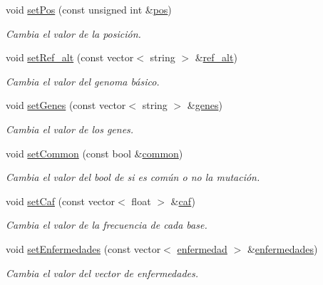 \begin{DoxyCompactItemize}
void \hyperlink{classmutacion_a2667189a28d3ac983a8f63ca92e81fba}{set\+Pos} (const unsigned int \&\hyperlink{classmutacion_ae1487b8648d0eaad68de5e4e5a87f3ff}{pos})
\begin{DoxyCompactList}\small\item\em Cambia el valor de la posición. \end{DoxyCompactList}\item 
void \hyperlink{classmutacion_a66b8d594a0bddbe4262f7a13ef551d07}{set\+Ref\+\_\+alt} (const vector$<$ string $>$ \&\hyperlink{classmutacion_abeb13e023fc9a34120106bccf58d5086}{ref\+\_\+alt})
\begin{DoxyCompactList}\small\item\em Cambia el valor del genoma básico. \end{DoxyCompactList}\item 
void \hyperlink{classmutacion_a91fd0ad088ac82897ccad36598b43830}{set\+Genes} (const vector$<$ string $>$ \&\hyperlink{classmutacion_a65fb9e2186d1c54d490289661b141aa1}{genes})
\begin{DoxyCompactList}\small\item\em Cambia el valor de los genes. \end{DoxyCompactList}\item 
void \hyperlink{classmutacion_ab62d36e9bad78d43ace74fdaec909ca6}{set\+Common} (const bool \&\hyperlink{classmutacion_a6dabfef6167d64030f095887b15f65dd}{common})
\begin{DoxyCompactList}\small\item\em Cambia el valor del bool de si es común o no la mutación. \end{DoxyCompactList}\item 
void \hyperlink{classmutacion_a52b79ec257cc96ad5c38a34ac4f2e827}{set\+Caf} (const vector$<$ float $>$ \&\hyperlink{classmutacion_aeb2ac56009900d9319873d00ee80e090}{caf})
\begin{DoxyCompactList}\small\item\em Cambia el valor de la frecuencia de cada base. \end{DoxyCompactList}\item 
void \hyperlink{classmutacion_acaad50a2aab9f6df3994a491eab44a86}{set\+Enfermedades} (const vector$<$ \hyperlink{classenfermedad}{enfermedad} $>$ \&\hyperlink{classmutacion_a0decaa0406675999e766f913e6347d79}{enfermedades})
\begin{DoxyCompactList}\small\item\em Cambia el valor del vector de enfermedades. \end{DoxyCompactList}\item 

\end{DoxyCompactItemize}
